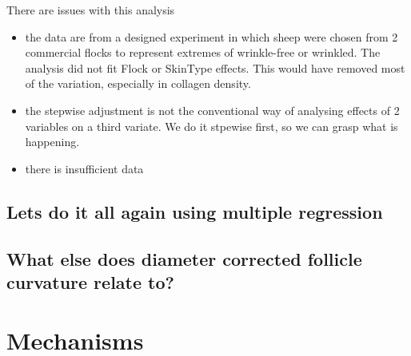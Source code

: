 \documentclass{article}
\begin{document}
There are issues with this analysis
\begin{itemize}
\item the data are from a designed experiment in which sheep were chosen from 2 commercial flocks to represent extremes of wrinkle-free or wrinkled. The analysis did not fit Flock or SkinType effects. This would have removed most of the variation, especially in collagen density. 
\item the stepwise adjustment is not the conventional way of analysing effects of 2 variables on a third variate.  We do it stpewise first, so we can grasp what is happening. 
\item there is insufficient data
\end{itemize}

\subsection{ Lets do it all again using multiple regression}

\subsection{ What else does diameter corrected follicle curvature relate to?}

\section{Mechanisms}




\end{document}
